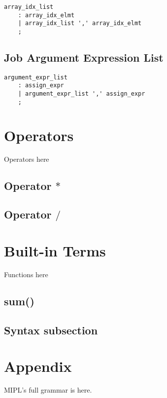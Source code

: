 \documentclass[prodmode,acmtecs]{acmsmall}
\begin{document}
\begin{lstlisting}
array_idx_list
	: array_idx_elmt
	| array_idx_list ',' array_idx_elmt
	;
\end{lstlisting}
\subsection{Job Argument Expression List}

\begin{lstlisting}
argument_expr_list
	: assign_expr
	| argument_expr_list ',' assign_expr
	;
\end{lstlisting}

\section{Operators}
Operators here

\subsection{Operator $*$}

\subsection{Operator $/$}

\section{Built-in Terms}
Functions here

\subsection{sum()}

\subsection{Syntax subsection}

\section*{Appendix}

MIPL's full grammar is here.

%

\end{document}
